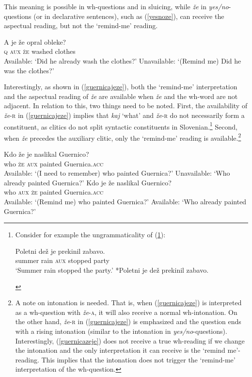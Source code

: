 \documentclass[output=paper,
modfonts,
newtxmath,
hidelinks
]{langscibook}
\begin{document}
\noindent This meaning is possible in wh-questions and in sluicing, while \textit{že} in \textit{yes/no}-questions (or in declarative sentences), such as (\ref{yesnoze}), can receive the aspectual reading, but not the `remind-me' reading. 

\begin{exe}
\ex \label{yesnoze}
\gll A je že opral obleke?\\
	\textsc{q} \textsc{aux} \textsc{že} washed clothes\\
	\glt Available: `Did he already wash the clothes?'
\glt Unavailable: `(Remind me) Did he was the clothes?'
\end{exe}

\noindent Interestingly, as shown in (\ref{guernicajeze}), both the `remind-me' interpretation and the aspectual reading of \textit{že} are available when \textit{že} and the wh-word are not adjacent. In relation to this, two things need to be noted. First, the availability of \textit{že}-\textsc{r} in (\ref{guernicajeze}) implies that \textit{kaj} `what' and \textit{že}-\textsc{r} do not necessarily form a constituent, as clitics do not split syntactic constituents in Slovenian.\footnote{Consider for example the ungrammaticality of (\ref{ib}):
\ea
\begin{xlista}
\ex
{
\gll	Poletni dež je prekinil zabavo.\\
 summer rain \textsc{aux} stopped party\\
\trans `Summer rain stopped the party.' 
}
\ex
{
 *Poletni je dež prekinil zabavo.
}
\label{ib}
\end{xlista}
\zlast} 
Second, when \textit{že} precedes the auxiliary clitic, only the `remind-me' reading is available.\footnote{A note on intonation is needed. That is, when (\ref{guernicajeze}) is interpreted as a wh-question with \textit{že}-\textsc{a}, it will also receive a normal wh-intonation. On the other hand, \textit{že}-\textsc{r} in (\ref{guernicajeze}) is emphasized and the question ends with a rising intonation (similar to the intonation in \textit{yes/no}-questions). Interestingly, (\ref{guernicazeje}) does not receive a true wh-reading if we change the intonation and the only interpretation it can receive is the `remind me'-reading. This implies that the intonation does not trigger the `remind-me' interpretation of the wh-question.} 

\begin{exe}
\ex 
\begin{xlist}
\ex \label{guernicazeje}
\gll Kdo že je naslikal Guernico? \\
		who \textsc{že} \textsc{aux} painted Guernica.\textsc{acc}\\
\trans  Available: `(I need to remember) who painted Guernica?'
\trans Unavailable: `Who already painted Guernica?'
\ex \label{guernicajeze}
\gll	Kdo je že naslikal Guernico?\\
		who \textsc{aux} \textsc{že} painted Guernica.\textsc{acc}\\
\trans	 Available: `(Remind me) who painted Guernica?'
\trans 	 Available: `Who already painted Guernica?'
\end{xlist}
\end{exe}
\end{document}
